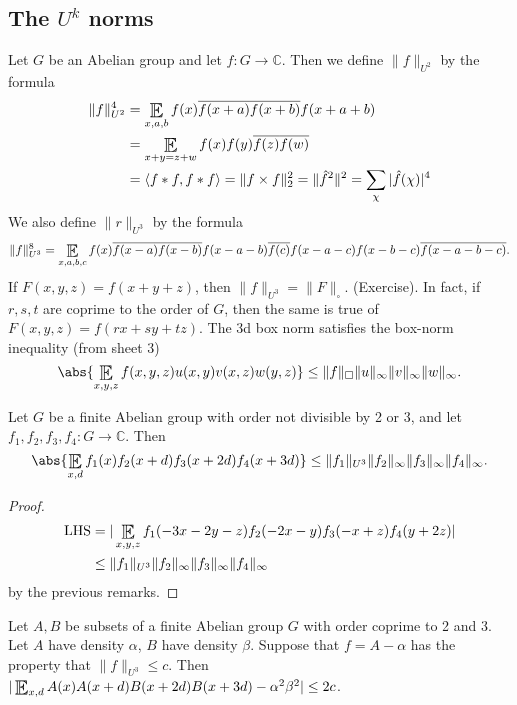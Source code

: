 \documentclass{article}
\DeclareMathOperator*{\E}{\scalerel*{\mathbb{E}}{\textstyle\sum}}
\newcommand{\1}[1]{\mathbbm{1}_{#1}}
\begin{document}
\subsection{The \texorpdfstring{$U^k$}{U} norms}
Let $G$ be an Abelian group and let $f: G \to \mathbb{C}$.  Then we define $\|f\|_{U^2}$ by the formula
\begin{align*}
  \|f\|_{U^2}^4 &= \E_{x,a,b} f(x) \overline{f(x+a)} \overline{f(x+b)} f(x+a+b) \\
                &= \E_{x+y = z+w} f(x) f(y) \overline{f(z)} \overline{f(w)} \\
                &= \langle f * f, f * f \rangle = \|f \times f\|_2^2 = \|\hat{f}^2\|^2 = \sum_{\chi} |\hat{f}(\chi)|^4
\end{align*}
We also define $\|r\|_{U^3}$ by the formula
\begin{equation*}
  \|f\|_{U^3}^8 = \E_{x,a,b,c} f(x) \overline{f(x-a)} \overline{f(x-b)} f(x-a-b) \overline{f(c)} f(x-a-c) f(x-b-c) \overline{f(x-a-b-c)}.
\end{equation*}
If $F(x,y,z) = f(x+y+z)$, then $\|f\|_{U^3} = \|F\|_\square$. (Exercise).
In fact, if $r,s,t$ are coprime to the order of $G$, then the same is true of $F(x,y,z) = f(rx+sy+tz)$.
The 3d box norm satisfies the box-norm inequality (from sheet 3)
\begin{equation*}
  \abs{\E_{x,y,z} f(x,y,z) u(x,y) v(x,z) w(y,z)} \leq \|f\|_\square \|u\|_\infty \|v\|_\infty \|w\|_\infty.
\end{equation*}
\begin{nlemma}
  Let $G$ be a finite Abelian group with order not divisible by 2 or 3, and let $f_1, f_2, f_3, f_4: G \to \mathbb{C}$. Then
  \begin{equation*}
    \abs{\E_{x,d} f_1(x) f_2(x+d) f_3(x+2d) f_4(x+3d)} \leq \|f_1\|_{U^3} \|f_2\|_\infty \|f_3\|_\infty \|f_4\|_\infty.
  \end{equation*}
\end{nlemma}
\begin{proof}
  \begin{align*}
    \text{LHS} &= |\E_{x,y,z} f_1(-3x-2y-z) f_2(-2x-y) f_3(-x+z) f_4(y+2z)| \\
               &\leq \|f_1\|_{U^3} \|f_2\|_\infty \|f_3\|_\infty \|f_4\|_\infty
  \end{align*}
  by the previous remarks.
\end{proof}
\begin{ncor}
  Let $A,B$ be subsets of a finite Abelian group $G$ with order coprime to 2 and 3. Let $A$ have density $\alpha$, $B$ have density $\beta$. Suppose that $f = A-\alpha$ has the property that $\|f\|_{U^3} \leq c$.
  Then $|\E_{x,d} A(x) A(x+d) B(x+2d) B(x+3d) - \alpha^2 \beta^2| \leq 2c$.
\end{ncor}
\end{document}
